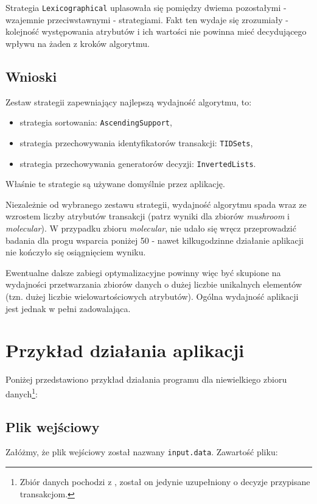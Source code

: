 \documentclass[a4paper,10pt]{article}
\begin{document}
 Strategia \verb+Lexicographical+ uplasowała się pomiędzy dwiema pozostałymi - wzajemnie przeciwstawnymi - strategiami.
 Fakt ten wydaje się zrozumiały - kolejność występowania atrybutów i ich wartości nie powinna mieć decydującego wpływu na żaden z kroków algorytmu.
 
 
 \subsection{Wnioski}
 Zestaw strategii zapewniający najlepszą wydajność algorytmu, to:
 
 \begin{itemize}
  \item strategia sortowania: \verb+AscendingSupport+,
  \item strategia przechowywania identyfikatorów transakcji: \verb+TIDSets+,
  \item strategia przechowywania generatorów decyzji: \verb+InvertedLists+.
 \end{itemize}
 
 Właśnie te strategie są używane domyślnie przez aplikację.

 Niezależnie od wybranego zestawu strategii, wydajność algorytmu spada wraz ze wzrostem liczby atrybutów transakcji (patrz wyniki dla zbiorów \emph{mushroom} i \emph{molecular}).
 W przypadku zbioru \emph{molecular}, nie udało się wręcz przeprowadzić badania dla progu wsparcia poniżej 50 - nawet kilkugodzinne działanie aplikacji nie kończyło się osiągnięciem wyniku.
 
 Ewentualne dalsze zabiegi optymalizacyjne powinny więc być skupione na wydajności przetwarzania zbiorów danych o dużej liczbie unikalnych elementów (tzn. dużej liczbie wielowartościowych atrybutów).
 Ogólna wydajność aplikacji jest jednak w pełni zadowalająca.
 
 


\section{Przykład działania aplikacji} \label{sec:example}
Poniżej przedstawiono przykład działania programu dla niewielkiego zbioru danych\footnote{Zbiór danych pochodzi z \cite{grm}, został on jedynie uzupełniony o decyzje przypisane transakcjom.}:

 \subsection{Plik wejściowy}
 Załóżmy, że plik wejściowy został nazwany \verb+input.data+.
 Zawartość pliku:
\end{document}
